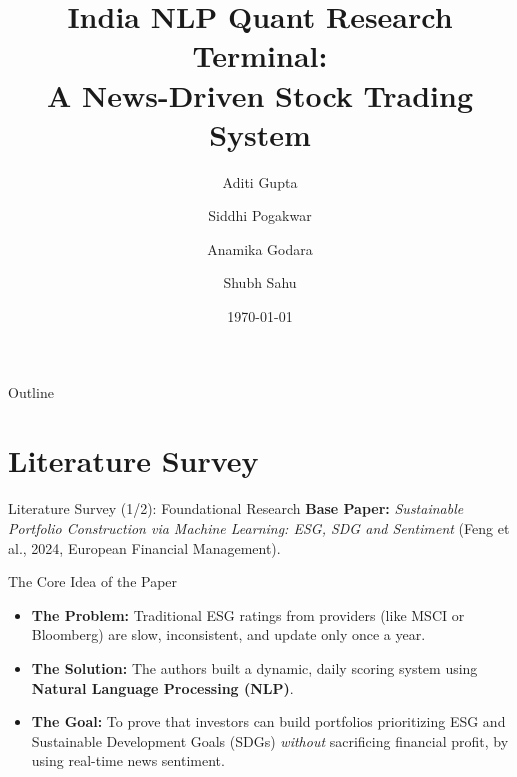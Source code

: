 \documentclass[aspectratio=169, 10pt]{beamer}
\title[Quant Research Terminal]{India NLP Quant Research Terminal:\\ A News-Driven Stock Trading System}
\author{Aditi Gupta \and Siddhi Pogakwar \and Anamika Godara \and Shubh Sahu}
\institute[IIT Mandi]{Indian Institute of Technology Mandi}
\date{\today}
\begin{document}
\begin{frame}
    \titlepage
\end{frame}

\begin{frame}{Outline}
    \tableofcontents[hideallsubsections]
\end{frame}

\section{Literature Survey}
\begin{frame}{Literature Survey (1/2): Foundational Research}
    \textbf{Base Paper:} \textit{Sustainable Portfolio Construction via Machine Learning: ESG, SDG and Sentiment} (Feng et al., 2024, European Financial Management).
    
    \vspace{0.5em}
    \begin{block}{The Core Idea of the Paper}
        \begin{itemize}
            \item \textbf{The Problem:} Traditional ESG ratings from providers (like MSCI or Bloomberg) are slow, inconsistent, and update only once a year.
            \item \textbf{The Solution:} The authors built a dynamic, daily scoring system using \textbf{Natural Language Processing (NLP)}.
            \item \textbf{The Goal:} To prove that investors can build portfolios prioritizing ESG and Sustainable Development Goals (SDGs) \textit{without} sacrificing financial profit, by using real-time news sentiment.
        \end{itemize}
    \end{block}
\end{frame}
\end{document}
